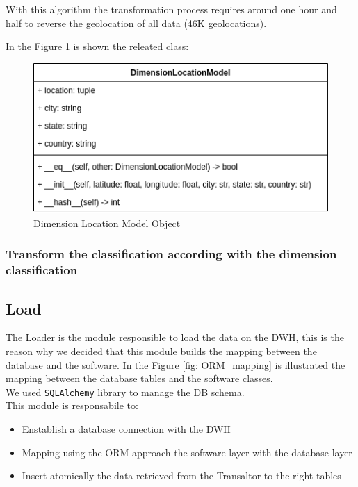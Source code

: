 \documentclass[conference]{IEEEtran}
\begin{document}
	With this algorithm the transformation process requires around one hour and half to reverse the geolocation of all data (46K geolocations).
	
	In the Figure \ref{fig:DimensionLocationModel} is shown the releated class:
	\begin{figure}[htpb]
		\centering
		\includegraphics[width=\columnwidth]{images/dimension_location_model.png}
		\caption{Dimension Location Model Object}
		\label{fig:DimensionLocationModel}
	\end{figure}
	
	
	\subsubsection{Transform the classification according with the dimension classification}

	
	\subsection{Load}
	The Loader is the module responsible to load the data on the DWH, this is the reason why we decided that this module builds the mapping between the database and the software. In the Figure \ref{fig: ORM_mapping} is illustrated the mapping between the database tables and the software classes.\\ We used \texttt{SQLAlchemy} library to manage the DB schema.\\ This module is responsabile to:
	\begin{itemize}
		\item Enstablish a database connection with the DWH
		\item Mapping using the ORM approach the software layer with the database layer
		\item Insert atomically the data retrieved from the Transaltor to the right tables
	\end{itemize}
	
\end{document}
